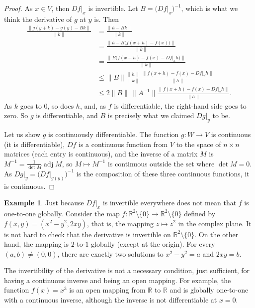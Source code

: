 \documentclass[12pt,openany]{book}
\newcommand{\snorm}[1]{\lVert {#1} \rVert}
\newcommand{\R}{{\mathbb{R}}}
\theoremstyle{plain}
\theoremstyle{remark}
\theoremstyle{definition}
\theoremstyle{exercise}
\theoremstyle{example}
\newtheorem{example}[thm]{Example}
\begin{document}
\begin{proof}
As $x \in V$, then $Df|_x$ is invertible.
Let $B = \bigl(Df|_x\bigr)^{-1}$, which is what we think the derivative of
$g$ at $y$ is.  Then
\begin{equation*}
\begin{split}
\frac{\snorm{g(y+k)-g(y)-Bk}}{\snorm{k}}
& =
\frac{\snorm{h-Bk}}{\snorm{k}}
\\
& =
\frac{\snorm{h-B\bigl(f(x+h)-f(x)\bigr)}}{\snorm{k}}
\\
& =
\frac{\snorm{B\bigl(f(x+h)-f(x)-Df|_x h\bigr)}}{\snorm{k}}
\\
& \leq
\snorm{B}
\frac{\snorm{h}}{\snorm{k}}\,
\frac{\snorm{f(x+h)-f(x)-Df|_x h}}{\snorm{h}}
\\
& \leq
2\snorm{B} \, \snorm{A^{-1}}
\frac{\snorm{f(x+h)-f(x)-Df|_x h}}{\snorm{h}} .
\end{split}
\end{equation*}
As $k$ goes to $0$, so does $h$,
and, as $f$ is differentiable,
the right-hand side goes to zero.
So $g$ is differentiable, and $B$
is precisely what we claimed $Dg|_y$ to be.

Let us show $g$ is continuously
differentiable.
The function $g \colon W \to V$ is continuous (it is differentiable),
$Df$ is a continuous function from $V$
to the space of $n \times n$ matrices (each entry is continuous),
and the inverse of a matrix $M$ is $M^{-1} = \frac{1}{\det M} \operatorname{adj} M$,
so $M \mapsto M^{-1}$ is continuous outside the set where $\det M = 0$.
As
$Dg|_y = {\bigl( Df|_{g(y)}\bigr)}^{-1}$ is the composition
of these three
continuous functions, it is continuous.
\end{proof}

\begin{example}
Just because $Df|_x$ is invertible everywhere does not
mean that $f$ is
one-to-one globally.  Consider
the map $f \colon \R^2 \setminus \{ 0 \} \to \R^2 \setminus \{
0 \}$ defined
by $f(x,y) = (x^2-y^2,2xy)$,  that is, the mapping $z \mapsto z^2$ in the
complex plane.  It is not hard to check that
the derivative is invertible on $\R^2 \setminus \{ 0 \}$.
On the other hand, the mapping is $2$-to-$1$ globally (except at the origin).
For every $(a,b) \not= (0,0)$, there are exactly two
solutions to $x^2-y^2=a$ and $2xy=b$.
\end{example}

The invertibility of the derivative is not a necessary
condition, just sufficient, for having a continuous inverse and being an open
mapping.  For example, the function $f(x) = x^3$ is an open mapping from $\R$
to $\R$ and is globally one-to-one with a continuous inverse, although the
inverse is not differentiable at $x=0$.
\end{document}
